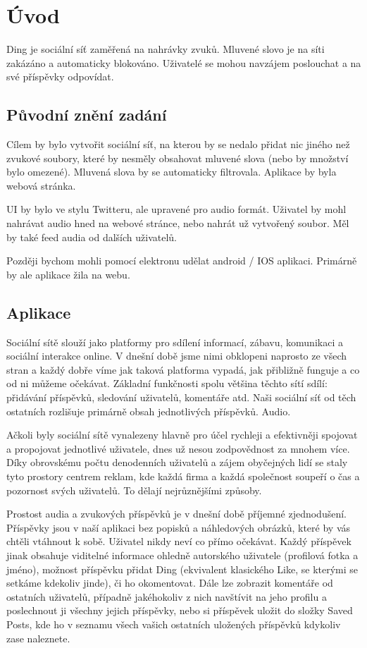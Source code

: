 \section{Úvod}
Ding je sociální síť zaměřená na nahrávky zvuků. Mluvené slovo je na síti zakázáno
a automaticky blokováno. Uživatelé se mohou navzájem poslouchat a na své příspěvky
odpovídat.

\subsection{Původní znění zadání}
Cílem by bylo vytvořit sociální síť, na kterou by se nedalo přidat nic jiného
než zvukové soubory, které by nesměly obsahovat mluvené slova (nebo by množství
bylo omezené). Mluvená slova by se automaticky filtrovala. Aplikace by byla
webová stránka.

UI by bylo ve stylu Twitteru, ale upravené pro audio formát. Uživatel by mohl
nahrávat audio hned na webové stránce, nebo nahrát už vytvořený soubor. Měl by
také feed audia od dalších uživatelů.

Později bychom mohli pomocí elektronu udělat android / IOS aplikaci. Primárně
by ale aplikace žila na webu. 

\subsection{Aplikace}
Sociální sítě slouží jako platformy pro sdílení informací, zábavu, komunikaci
a sociální interakce online. V dnešní době jsme nimi obklopeni naprosto ze všech
stran a každý dobře víme jak taková platforma vypadá, jak přibližně funguje a co
od ni můžeme očekávat. Základní funkčnosti spolu většina těchto sítí sdílí:
přidávání příspěvků, sledování uživatelů, komentáře atd. Naši sociální síť 
od těch ostatních rozlišuje primárně obsah jednotlivých příspěvků. Audio.

Ačkoli byly sociální sítě vynalezeny hlavně pro účel rychleji a efektivněji
spojovat a propojovat jednotlivé uživatele, dnes už nesou zodpovědnost za 
mnohem více. Díky obrovskému počtu denodenních uživatelů a zájem obyčejných
lidí se staly tyto prostory centrem reklam, kde každá firma a každá společnost
soupeří o čas a pozornost svých uživatelů. To dělají nejrůznějšími způsoby.

Prostost audia a zvukových příspěvků je v dnešní době příjemné zjednodušení.
Příspěvky jsou v naší aplikaci bez popisků a náhledových obrázků, které by
vás chtěli vtáhnout k sobě. Uživatel nikdy neví co přímo očekávat.
Každý příspěvek jinak obsahuje viditelné informace ohledně autorského
uživatele (profilová fotka a jméno), možnost příspěvku přidat Ding (ekvivalent
klasického Like, se kterými se setkáme kdekoliv jinde), či ho okomentovat.
Dále lze zobrazit komentáře od ostatních uživatelů, případně jakéhokoliv z nich
navštívit na jeho profilu a poslechnout ji všechny jejich příspěvky, nebo si 
příspěvek uložit do složky Saved Posts, kde ho v seznamu všech vašich ostatních 
uložených příspěvků kdykoliv zase naleznete.